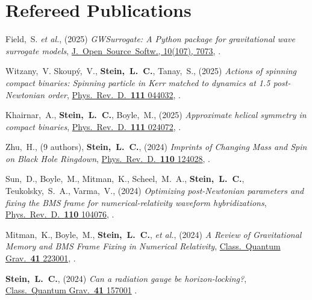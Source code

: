 \section{\sc Refereed Publications}
\addtocounter{pubCounter}{-1}
\begin{etaremune}[start=\value{pubCounter}]
\item
  Field,~S.
  {\it et al.},
  (2025)
  {\it GWSurrogate: A Python package for gravitational wave surrogate models},
  \href{https://doi.org/10.21105/joss.07073}{J.~Open~Source~Softw., 10(107), 7073},
  .
\item
  Witzany,~V.
  Skoupý,~V.,
  {\bf Stein,~L.~C.},
  Tanay,~S.,
  (2025)
  {\it Actions of spinning compact binaries: Spinning particle in Kerr matched to dynamics at 1.5 post-Newtonian order},
  \href{https://doi.org/10.1103/PhysRevD.111.044032}%
  {Phys.~Rev.~D.~{\bf 111} 044032},
  .
\item
  Khairnar,~A.,
  {\bf Stein,~L.~C.},
  Boyle,~M.,
  (2025)
  {\it Approximate helical symmetry in compact binaries},
  \href{https://doi.org/10.1103/PhysRevD.111.024072}%
  {Phys.~Rev.~D.~{\bf 111} 024072},
  .
\item
  Zhu,~H.,
  (9 authors),
  {\bf Stein,~L.~C.},
  (2024)
  {\it Imprints of Changing Mass and Spin on Black Hole Ringdown},
  \href{https://doi.org/10.1103/PhysRevD.110.124028}%
  {Phys.~Rev.~D.~{\bf 110} 124028},
  .
\item
  Sun,~D.,
  Boyle,~M.,
  Mitman,~K.,
  Scheel,~M.~A.,
  {\bf Stein,~L.~C.},
  Teukolsky,~S.~A.,
  Varma,~V.,
  (2024)
  {\it Optimizing post-Newtonian parameters and fixing the BMS frame for numerical-relativity waveform hybridizations},
  \href{https://doi.org/10.1103/PhysRevD.110.104076}%
  {Phys.~Rev.~D.~{\bf 110} 104076},
  .
\item
  Mitman,~K.,
  Boyle,~M.,
  {\bf Stein,~L.~C.},
  {\it et al.},
  (2024)
  {\it A Review of Gravitational Memory and BMS Frame Fixing in Numerical Relativity},
  \href{https://doi.org/10.1088/1361-6382/ad83c2}%
  {Class.~Quantum Grav.~{\bf 41} 223001},
  .
\item
  {\bf Stein,~L.~C.},
  (2024)
  {\it Can a radiation gauge be horizon-locking?},
  \href{https://doi.org/10.1088/1361-6382/ad563b}%
  {Class.~Quantum Grav.~{\bf 41} 157001}
  .
\item

\end{etaremune}

